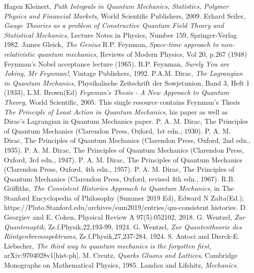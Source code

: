 \documentclass[12pt]{article}
\begin{document}
\begin{thebibliography}{}
 Hagen Kleinert, {\it Path Integrals in Quantum Mechanics, Statistics, Polymer Physics and Financial Markets}, World
Scientific Publishers, 2009.
 Erhard Seiler, {\it Gauge Theories as a problem of Constructive Quantum Field Theory and Statistical Mechanics}, Lecture
Notes in Physics, Number 159, Springer-Verlag 1982.
 James Gleick, {\it The Genius}
 R.P. Feynman, {\it Space-time approach to non-relativistic quantum mechanics}, Reviews of Modern Physics, Vol 20, p.267
(1948)
 Feynman's Nobel acceptance lecture (1965).
 R.P. Feynman, {\it Surely You are Joking, Mr Feynman!}, Vintage Publishers, 1992.
 P.A.M. Dirac, {\it The Lagrangian in Quantum Mechanics}, 
Physikalische Zeitschrift der Sowjetunion, Band 3, Heft 1 (1933),
 L.M. Brown(Ed) {\it Feynman's Thesis - A New Approach to Quantum Theory}, World Scientific, 2005. This single
resource contains Feynman's Thesis {\it The Principle of Least Action in Quantum Mechanics}, his paper as well as Dirac's Lagrangian in Quantum Mechanics paper.
 P. A. M. Dirac, The Principles of Quantum Mechanics (Clarendon Press, Oxford, 1st edn., 1930). 
 P. A. M. Dirac, The Principles of Quantum Mechanics (Clarendon Press, Oxford, 2nd edn., 1935). 
 P. A. M. Dirac, The Principles of Quantum Mechanics (Clarendon Press, Oxford, 3rd edn., 1947). 
 P. A. M. Dirac, The Principles of Quantum Mechanics (Clarendon Press, Oxford, 4th edn., 1957). 
 P. A. M. Dirac, The Principles of Quantum Mechanics (Clarendon Press, Oxford, revised 4th edn., 1967). 
 R.B. Griffiths, {\it The Consistent Histories Approach to Quantum Mechanics}, in The Stanford Encyclopedia of
Philosophy (Summer 2019 Ed), Edward N Zalta(Ed.); https://Plato.Stanford.edu/archives/sum2019/entries/qm-consistent histories.
 D. Georgiev and E. Cohen, Physical Review A 97(5):052102, 2018.
 G. Wentzel, {\it Zur Quantenoptik}, Zs.f.Physik,22,193-99, 1924.
 G. Wentzel, {\it Zur Quantentheorie des R\"ontgenbremsspektrums}, Zs.f.Physik,27,237-284, 1924.
 S. Antoci and Dierck-E. Liebscher, {\it The third way to quantum mechanics is the forgotten first}, arXiv:9704028v1[hist-ph].
 M. Creutz, {\it Quarks Gluons and Lattices}, Cambridge Monographs on Mathematical Physics, 1985.
 Landau and Lifshitz, {\it Mechanics}.
\end{thebibliography}
\end{document}

